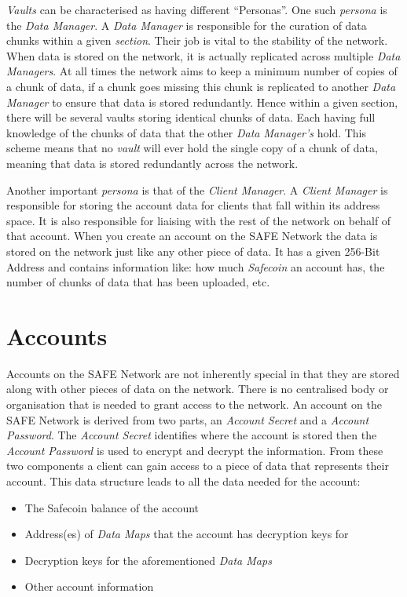 \textit{Vaults} can be characterised as having different ``Personas''. One such \textit{persona} is the \textit{Data Manager}. A \textit{Data Manager} is responsible for the curation of data chunks within a given \textit{section}. Their job is vital to the stability of the network. When data is stored on the network, it is actually replicated across multiple \textit{Data Managers}. At all times the network aims to keep a minimum number of copies of a chunk of data, if a chunk goes missing this chunk is replicated to another \textit{Data Manager} to ensure that data is stored redundantly. Hence within a given section, there will be several vaults storing identical chunks of data. Each having full knowledge of the chunks of data that the other \textit{Data Manager's} hold. This scheme means that no \textit{vault} will ever hold the single copy of a chunk of data, meaning that data is stored redundantly across the network.

Another important \textit{persona} is that of the \textit{Client Manager}. A \textit{Client Manager} is responsible for storing the account data for clients that fall within its address space. It is also responsible for liaising with the rest of the network on behalf of that account.  When you create an account on the SAFE Network the data is stored on the network just like any other piece of data. It has a given 256-Bit Address and contains information like: how much \textit{Safecoin} an account has, the number of chunks of data that has been uploaded, etc.

\section{Accounts}

Accounts on the SAFE Network are not inherently special in that they are stored along with other pieces of data on the network. There is no centralised body or organisation that is needed to grant access to the network. An account on the SAFE Network is derived from two parts, an \textit{Account Secret} and a \textit{Account Password}. The \textit{Account Secret} identifies where the account is stored then the \textit{Account Password} is used to encrypt and decrypt the information. From these two components a client can gain access to a piece of data that represents their account. This data structure leads to all the data needed for the account:

\begin{itemize}
	\item The Safecoin balance of the account
	\item Address(es) of \textit{Data Maps} that the account has decryption keys for
	\item Decryption keys for the aforementioned \textit{Data Maps}
	\item Other account information
\end{itemize}
	

